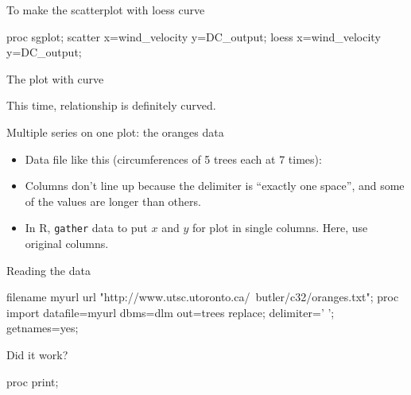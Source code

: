 \documentclass[unknownkeysallowed]{beamer}\usepackage[]{graphicx}\usepackage[]{color}
\begin{document}
\begin{frame}[fragile]{To make the scatterplot with loess curve}
  
\begin{Sascode}[store=mje]
proc sgplot;
  scatter x=wind_velocity y=DC_output;
  loess x=wind_velocity y=DC_output;
\end{Sascode}
  
  
\end{frame}

\begin{frame}[fragile]{The plot with curve}
  
  
  This time, relationship is definitely curved.
  
\end{frame}


\begin{frame}[fragile]{Multiple series on one plot: the oranges data}

  \begin{itemize}
  \item Data file like this (circumferences of 5 trees each at 7
    times):
    


\item Columns don't line up because the delimiter is ``exactly one
  space'', and some of the values are longer than others.
\item In R, \texttt{gather} data to  put $x$ and $y$ for plot in
  single columns. Here, use original columns.
  \end{itemize}
  
\end{frame}

\begin{frame}[fragile]{Reading the data}
  
    \begin{Datastep}
filename myurl url 
  "http://www.utsc.utoronto.ca/~butler/c32/oranges.txt";      
proc import
  datafile=myurl
    dbms=dlm
    out=trees
    replace;
  delimiter=' ';
  getnames=yes;
    \end{Datastep}

  
\end{frame}

\begin{frame}[fragile]{Did it work?}
  
  \begin{Sascode}[store=ora]
proc print;    
  \end{Sascode}
  
  
\end{frame}
\end{document}
